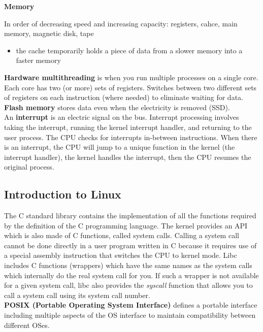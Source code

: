 \documentclass{article}
\begin{document}
    \noindent \textbf{Memory}

    \noindent In order of decreasing speed and increasing capacity: registers, cahce, main memory, magnetic disk, tape

    \begin{itemize}
    \item the cache temporarily holds a piece of data from a slower memory into a faster memory
    \end{itemize}

    \noindent \textbf{Hardware multithreading} is when you run multiple processes on a single core. Each core has two (or more) sets of registers. Switches between two different sets of registers on each instruction (where needed) to eliminate waiting for data. \\

    \noindent \textbf{Flash memory} stores data even when the electricity is removed (SSD). \\

    \noindent An \textbf{interrupt} is an electric signal on the bus. Interrupt processing involves taking the interrupt, running the kernel interrupt handler, and returning to the user process. The CPU checks for interrupts in-between instructions. When there is an interrupt, the CPU will jump to a unique function in the kernel (the interrupt handler), the kernel handles the interrupt, then the CPU resumes the original process. 

\subsection{Introduction to Linux}

    The C standard library contains the implementation of all the functions required by the definition of the C programming language. The kernel provides an API which is also made of C functions, called system calls. Calling a system call cannot be done directly in a user program written in C because it requires use of a special assembly instruction that switches the CPU to kernel mode. Libc includes C functions (wrappers) which have the same names as the system calls which internally do the real system call for you. If such a wrapper is not available for a given system call, libc also provides the \emph{syscall} function that allows you to call a system call using its system call number. \\

    \noindent \textbf{POSIX (Portable Operating System Interface)} defines a portable interface including multiple aspects of the OS interface to maintain compatibility between different OSes. \\
\end{document}
